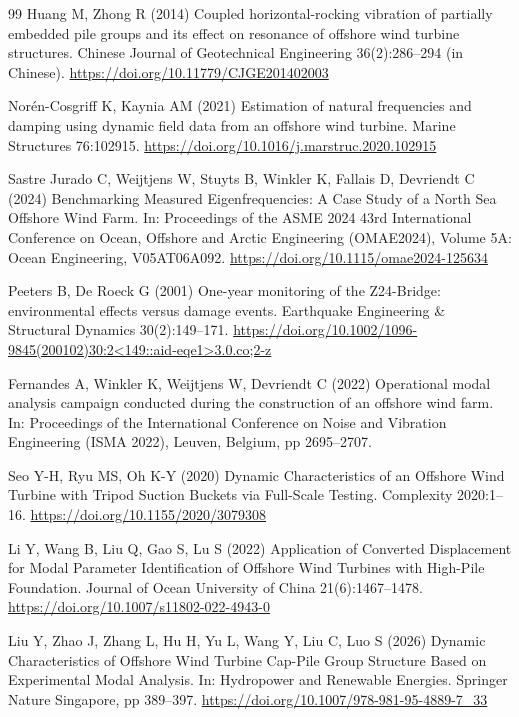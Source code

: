 \documentclass[11pt]{article}
\begin{document}
\begin{thebibliography}{99}
Huang M, Zhong R (2014) Coupled horizontal-rocking vibration of partially embedded pile groups and its effect on resonance of offshore wind turbine structures. Chinese Journal of Geotechnical Engineering 36(2):286--294 (in Chinese). \url{https://doi.org/10.11779/CJGE201402003}

Nor{\'e}n-Cosgriff K, Kaynia AM (2021) Estimation of natural frequencies and damping using dynamic field data from an offshore wind turbine. Marine Structures 76:102915. \url{https://doi.org/10.1016/j.marstruc.2020.102915}

Sastre Jurado C, Weijtjens W, Stuyts B, Winkler K, Fallais D, Devriendt C (2024) Benchmarking Measured Eigenfrequencies: A Case Study of a North Sea Offshore Wind Farm. In: Proceedings of the ASME 2024 43rd International Conference on Ocean, Offshore and Arctic Engineering (OMAE2024), Volume 5A: Ocean Engineering, V05AT06A092. \url{https://doi.org/10.1115/omae2024-125634}

Peeters B, De Roeck G (2001) One-year monitoring of the Z24-Bridge: environmental effects versus damage events. Earthquake Engineering \& Structural Dynamics 30(2):149--171. \url{https://doi.org/10.1002/1096-9845(200102)30:2<149::aid-eqe1>3.0.co;2-z}

Fernandes A, Winkler K, Weijtjens W, Devriendt C (2022) Operational modal analysis campaign conducted during the construction of an offshore wind farm. In: Proceedings of the International Conference on Noise and Vibration Engineering (ISMA 2022), Leuven, Belgium, pp 2695--2707.

Seo Y-H, Ryu MS, Oh K-Y (2020) Dynamic Characteristics of an Offshore Wind Turbine with Tripod Suction Buckets via Full-Scale Testing. Complexity 2020:1--16. \url{https://doi.org/10.1155/2020/3079308}

Li Y, Wang B, Liu Q, Gao S, Lu S (2022) Application of Converted Displacement for Modal Parameter Identification of Offshore Wind Turbines with High-Pile Foundation. Journal of Ocean University of China 21(6):1467--1478. \url{https://doi.org/10.1007/s11802-022-4943-0}

Liu Y, Zhao J, Zhang L, Hu H, Yu L, Wang Y, Liu C, Luo S (2026) Dynamic Characteristics of Offshore Wind Turbine Cap-Pile Group Structure Based on Experimental Modal Analysis. In: Hydropower and Renewable Energies. Springer Nature Singapore, pp 389--397. \url{https://doi.org/10.1007/978-981-95-4889-7_33}


\end{thebibliography}
\end{document}
